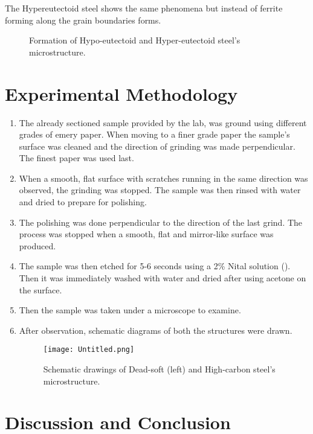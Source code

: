\documentclass[12pt,a4paper]{article}
\begin{document}
The Hypereutectoid steel shows the same phenomena but instead of ferrite forming along the grain boundaries  forms.\cite{camp}

\begin{figure}[H]%
    \centering
    \quad
    \caption{Formation of Hypo-eutectoid and Hyper-eutectoid steel's microstructure.}%
    \label{hhp}%
\end{figure}

\section{Experimental Methodology}
\begin{enumerate}
\item The already sectioned sample provided by the lab, was ground using different grades of emery paper. When moving to a finer grade paper the sample's surface was cleaned and the direction of grinding was made perpendicular. The finest paper was used last.
\item When a smooth, flat surface with scratches running in the same direction was observed, the grinding was stopped. The sample was then rinsed with water and dried to prepare for polishing.
\item The polishing was done perpendicular to the direction of the last grind. The process was stopped when a smooth, flat and mirror-like surface was produced.
\item The sample was then etched for 5-6 seconds using a 2\% Nital solution (). Then it was immediately washed with water and dried after using acetone on the surface.
\item Then the sample was taken under a microscope to examine.
\item After observation, schematic diagrams of both the structures were drawn.
\begin{figure}[H]
\centering
\texttt{[image: Untitled.png]} 
\caption{Schematic drawings of Dead-soft (left) and High-carbon steel's microstructure.}
\end{figure}
\end{enumerate}

\section{Discussion and Conclusion}
\end{document}

